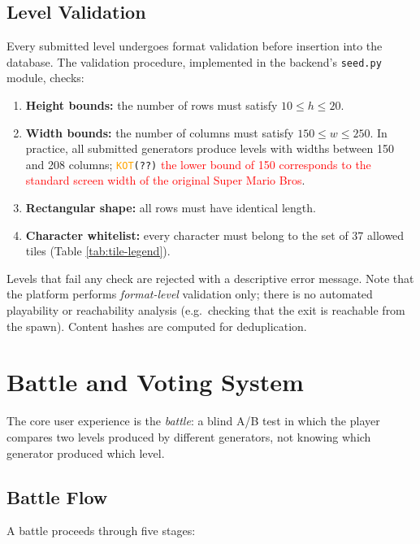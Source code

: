 \documentclass[shortabstract, mgr, english]{iithesis}
\newcommand{\DEBUG}[1]{{#1}} %
\newcommand{\KOT}[1]{\DEBUG{\tt{\textcolor{orange}{KOT}(}{#1}{)}}}
\newcommand{\changed}[1]{\textcolor{red}{#1}}
\begin{document}
\subsection{Level Validation}
\label{subsec:sd-level-validation}

Every submitted level undergoes format validation before insertion into the database. The
validation procedure, implemented in the backend's \texttt{seed.py} module, checks:

\begin{enumerate}
    \item \textbf{Height bounds:} the number of rows must satisfy
          $10 \leq h \leq 20$.
    \item \textbf{Width bounds:} the number of columns must satisfy
          $150 \leq w \leq 250$.  In practice, all submitted generators produce levels
          with widths between 150 and 208 columns; \KOT{??} \changed{the lower bound of 150
          corresponds to the standard screen width of the original Super Mario Bros}.
    \item \textbf{Rectangular shape:} all rows must have identical length.
    \item \textbf{Character whitelist:} every character must belong to the set of
          37 allowed tiles (Table \ref{tab:tile-legend}).
\end{enumerate}

Levels that fail any check are rejected with a descriptive error message. Note that the
platform performs \emph{format-level} validation only; there is no automated playability
or reachability analysis (e.g.\ checking that the exit is reachable from the spawn).
Content hashes are computed for deduplication.

\section{Battle and Voting System}
\label{sec:sd-battle}

The core user experience is the \emph{battle}: a blind A/B test in which the player
compares two levels produced by different generators, not knowing which generator
produced which level.

\subsection{Battle Flow}
\label{subsec:sd-battle-flow}

A battle proceeds through five stages:
\end{document}
